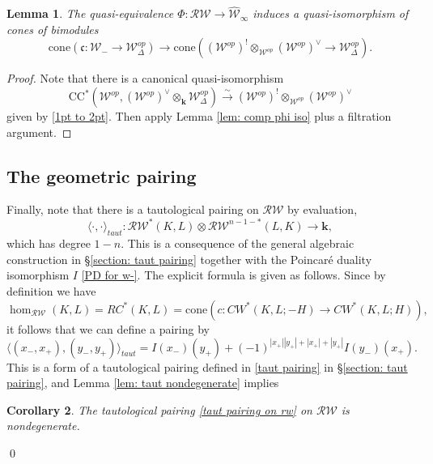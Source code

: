 \documentclass[11pt]{amsproc}
\def\K{{\mathbf{k}}}
\def\w{\mathcal{W}(E)}
\def\r#1{\mathrm{#1}}
\def\w{\mathcal{W}}
\def\rw{\mathcal{RW}}
\def\D{\Delta}
\def\cone{\mathrm{cone}}
\def\winf{\widehat{\w}_{\infty}}
\def\ck{\mathfrak{c}}
\newtheorem{lem}{Lemma}[section]
\newtheorem{cor}[lem]{Corollary}
\theoremstyle{remark}
\numberwithin{equation}{section}
\begin{document}
\begin{lem}\label{lem: continuation to chern}
The quasi-equivalence $\Phi: \rw \to \winf$ induces a quasi-isomorphism of cones of bimodules
\begin{equation}
\cone(\ck: \w_{-} \to \w^{op}_{\D}) \to \cone((\w^{op})^{!} \otimes_{\w^{op}} (\w^{op})^{\vee} \to \w^{op}_{\D}).
\end{equation}
\end{lem}
\begin{proof}
Note that there is a canonical quasi-isomorphism 
\[
\r{CC}^{*}(\w^{op}, (\w^{op})^{\vee} \otimes_{\K} \w_{\D}^{op}) \stackrel{\sim}\to (\w^{op})^{!} \otimes_{\w^{op}} (\w^{op})^{\vee}
\]
given by \eqref{1pt to 2pt}.
Then apply Lemma \ref{lem: comp phi iso} plus a filtration argument.
\end{proof}

\subsection{The geometric pairing}\label{section: rw taut pairing}

Finally, note that there is a tautological pairing on $\rw$ by evaluation,
\begin{equation}\label{taut pairing on rw}
\langle \cdot, \cdot \rangle_{taut}: \rw^{*}(K, L) \otimes \rw^{n-1-*}(L, K) \to \K,
\end{equation}
which has degree $1-n$.
This is a consequence of the general algebraic construction in \S\ref{section: taut pairing} together with the Poincar\'{e} duality isomorphism $I$ \eqref{PD for w-}.
The explicit formula is given as follows.
Since by definition we have
\begin{equation}
\hom_{\rw}(K, L) = RC^{*}(K, L) = \cone(c: CW^{*}(K, L; -H) \to CW^{*}(K, L; H)),
\end{equation}
it follows that we can define a pairing by
\begin{equation}
\langle (x_{-}, x_{+}), (y_{-}, y_{+}) \rangle_{taut} = I(x_{-})(y_{+}) + (-1)^{|x_{+}||y_{+}| + |x_{+}| + |y_{+}|} I(y_{-})(x_{+}).
\end{equation}
This is a form of a tautological pairing defined in \eqref{taut pairing} in \S\ref{section: taut pairing},
and Lemma \ref{lem: taut nondegenerate} implies

\begin{cor}\label{cor: rw taut nondegenerate}
The tautological pairing \eqref{taut pairing on rw} on $\rw$ is nondegenerate.
\end{cor} \qed
\end{document}
